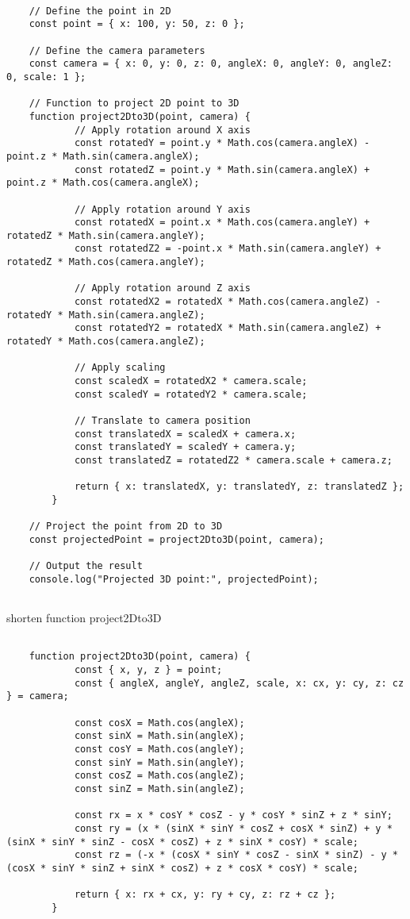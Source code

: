 \begin{lstlisting}
	
	// Define the point in 2D
	const point = { x: 100, y: 50, z: 0 };

	// Define the camera parameters
	const camera = { x: 0, y: 0, z: 0, angleX: 0, angleY: 0, angleZ: 0, scale: 1 };

	// Function to project 2D point to 3D
	function project2Dto3D(point, camera) {
			// Apply rotation around X axis
			const rotatedY = point.y * Math.cos(camera.angleX) - point.z * Math.sin(camera.angleX);
			const rotatedZ = point.y * Math.sin(camera.angleX) + point.z * Math.cos(camera.angleX);

			// Apply rotation around Y axis
			const rotatedX = point.x * Math.cos(camera.angleY) + rotatedZ * Math.sin(camera.angleY);
			const rotatedZ2 = -point.x * Math.sin(camera.angleY) + rotatedZ * Math.cos(camera.angleY);

			// Apply rotation around Z axis
			const rotatedX2 = rotatedX * Math.cos(camera.angleZ) - rotatedY * Math.sin(camera.angleZ);
			const rotatedY2 = rotatedX * Math.sin(camera.angleZ) + rotatedY * Math.cos(camera.angleZ);

			// Apply scaling
			const scaledX = rotatedX2 * camera.scale;
			const scaledY = rotatedY2 * camera.scale;

			// Translate to camera position
			const translatedX = scaledX + camera.x;
			const translatedY = scaledY + camera.y;
			const translatedZ = rotatedZ2 * camera.scale + camera.z;

			return { x: translatedX, y: translatedY, z: translatedZ };
		}

	// Project the point from 2D to 3D
	const projectedPoint = project2Dto3D(point, camera);

	// Output the result
	console.log("Projected 3D point:", projectedPoint);
	
\end{lstlisting}

\begin{leftBox}
	shorten function project2Dto3D
\end{leftBox}

\begin{lstlisting}
	
	function project2Dto3D(point, camera) {
			const { x, y, z } = point;
			const { angleX, angleY, angleZ, scale, x: cx, y: cy, z: cz } = camera;

			const cosX = Math.cos(angleX);
			const sinX = Math.sin(angleX);
			const cosY = Math.cos(angleY);
			const sinY = Math.sin(angleY);
			const cosZ = Math.cos(angleZ);
			const sinZ = Math.sin(angleZ);

			const rx = x * cosY * cosZ - y * cosY * sinZ + z * sinY;
			const ry = (x * (sinX * sinY * cosZ + cosX * sinZ) + y * (sinX * sinY * sinZ - cosX * cosZ) + z * sinX * cosY) * scale;
			const rz = (-x * (cosX * sinY * cosZ - sinX * sinZ) - y * (cosX * sinY * sinZ + sinX * cosZ) + z * cosX * cosY) * scale;

			return { x: rx + cx, y: ry + cy, z: rz + cz };
		}
	
\end{lstlisting}


